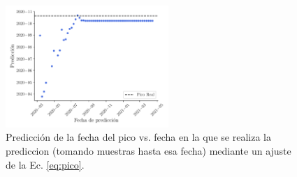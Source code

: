 \documentclass[twocolumn,aps,prl]{revtex4-1}
\begin{document}
\begin{figure}[ht!]
  \centering
      \centering
      \includegraphics[width = 0.55\textwidth]{figuras/ex02-prediccion-fecha_prediccion.pdf} 
      \caption{Predicción de la fecha del pico vs. fecha en la que se realiza la prediccion (tomando muestras hasta esa fecha) mediante un ajuste de la Ec. \ref{eq:pico}.}
      \label{fig:ex02-semanas}
\end{figure}
\end{document}
